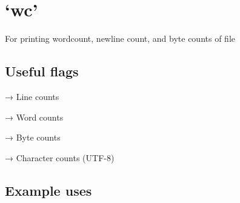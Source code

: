     
    \maketitle
    
    

    
    \section{`wc'}\label{wc}

For printing wordcount, newline count, and byte counts of file

    \subsection{Useful flags}\label{useful-flags}

\begin{Shaded}
\begin{Highlighting}[]
 
\end{Highlighting}
\end{Shaded}

→ Line counts

\begin{Shaded}
\begin{Highlighting}[]
 
\end{Highlighting}
\end{Shaded}

→ Word counts

\begin{Shaded}
\begin{Highlighting}[]
 
\end{Highlighting}
\end{Shaded}

→ Byte counts

\begin{Shaded}
\begin{Highlighting}[]
 
\end{Highlighting}
\end{Shaded}

→ Character counts (UTF-8)

    \subsection{Example uses}\label{example-uses}

\begin{Shaded}
\begin{Highlighting}[]
 
\end{Highlighting}
\end{Shaded}

